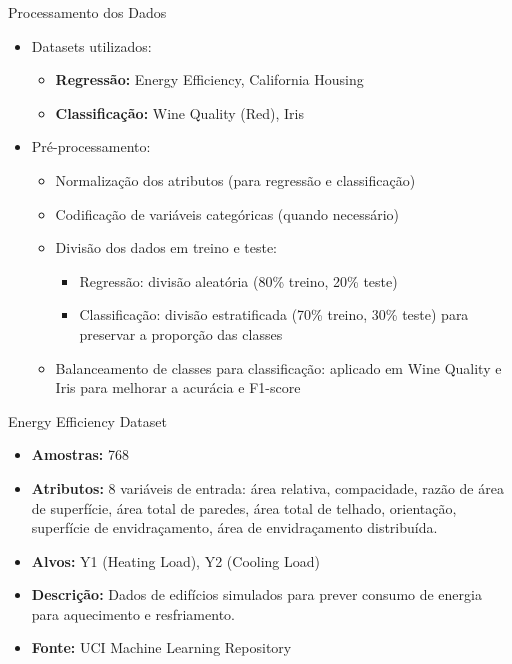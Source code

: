 \documentclass[aspectratio=169]{beamer}
\begin{document}
\begin{frame}{Processamento dos Dados}
  \justifying
  \begin{itemize}
   \item Datasets utilizados:
    \begin{itemize}
      \item \textbf{Regressão:} Energy Efficiency, California Housing
      \item \textbf{Classificação:} Wine Quality (Red), Iris
    \end{itemize}
    \item Pré-processamento:
      \begin{itemize}
        \item Normalização dos atributos (para regressão e classificação)
        \item Codificação de variáveis categóricas (quando necessário)
        \item Divisão dos dados em treino e teste:
          \begin{itemize}
            \item Regressão: divisão aleatória (80\% treino, 20\% teste)
            \item Classificação: divisão estratificada (70\% treino, 30\% teste) para preservar a proporção das classes
          \end{itemize}
        \item Balanceamento de classes para classificação: aplicado em Wine Quality e Iris para melhorar a acurácia e F1-score
      \end{itemize}
  \end{itemize}
\end{frame}

\begin{frame}{Energy Efficiency Dataset}
  \begin{itemize}
    \item \textbf{Amostras:} 768
    \item \textbf{Atributos:} 8 variáveis de entrada: área relativa, compacidade, razão de área de superfície, área total de paredes, área total de telhado, orientação, superfície de envidraçamento, área de envidraçamento distribuída.
    \item \textbf{Alvos:} Y1 (Heating Load), Y2 (Cooling Load)
    \item \textbf{Descrição:} Dados de edifícios simulados para prever consumo de energia para aquecimento e resfriamento.
    \item \textbf{Fonte:} UCI Machine Learning Repository
  \end{itemize}
\end{frame}
\end{document}
